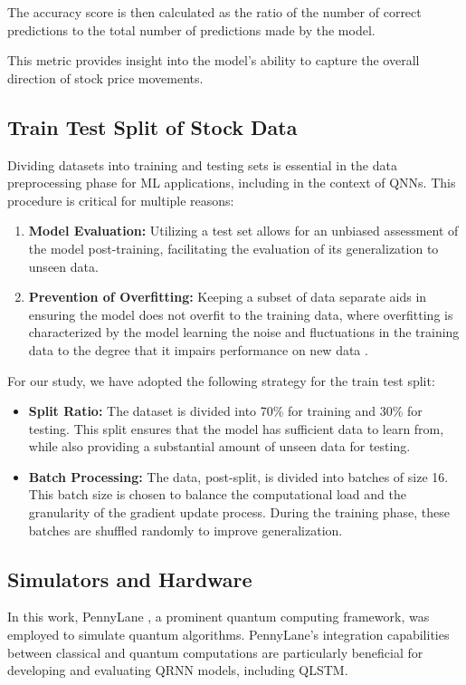 The accuracy score is then calculated as the ratio of the number of correct predictions to the total number of predictions made by the model. 

This metric provides insight into the model's ability to capture the overall direction of stock price movements.

\subsection{Train Test Split of Stock Data}
Dividing datasets into training and testing sets is essential in the data preprocessing phase for ML applications, including in the context of QNNs. This procedure is critical for multiple reasons:

\begin{enumerate}
    \item \textbf{Model Evaluation:} Utilizing a test set allows for an unbiased assessment of the model post-training, facilitating the evaluation of its generalization to unseen data.
    \item \textbf{Prevention of Overfitting:} Keeping a subset of data separate aids in ensuring the model does not overfit to the training data, where overfitting is characterized by the model learning the noise and fluctuations in the training data to the degree that it impairs performance on new data \cite{goodfellow2016deep}.
\end{enumerate}

For our study, we have adopted the following strategy for the train test split:

\begin{itemize}
    \item \textbf{Split Ratio:} The dataset is divided into 70\% for training and 30\% for testing. This split ensures that the model has sufficient data to learn from, while also providing a substantial amount of unseen data for testing.
    \item \textbf{Batch Processing:} The data, post-split, is divided into batches of size 16. This batch size is chosen to balance the computational load and the granularity of the gradient update process. During the training phase, these batches are shuffled randomly to improve generalization.
\end{itemize}

\subsection{Simulators and Hardware}
In this work, PennyLane \cite{bergholm2022pennylane}, a prominent quantum computing framework, was employed to simulate quantum algorithms. PennyLane's integration capabilities between classical and quantum computations are particularly beneficial for developing and evaluating QRNN models, including QLSTM.

